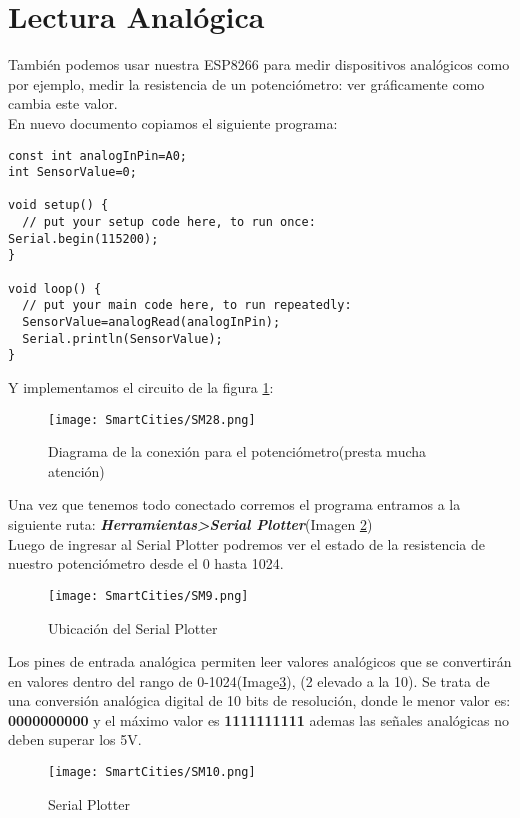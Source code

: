 \documentclass[
	12pt, %
	fleqn, %
	a4paper, %
	oneside, %
]{LegrandOrangeBook}
\begin{document}
\section{Lectura Analógica}
También podemos usar nuestra ESP8266 para medir dispositivos analógicos como por ejemplo, medir la resistencia de un potenciómetro:  ver gráficamente como cambia este valor.\\
En nuevo documento copiamos el siguiente programa:
\begin{lstlisting}[language=Arduino,caption={Medir la resistencia de un potenciómetro}]
const int analogInPin=A0;
int SensorValue=0;

void setup() {
  // put your setup code here, to run once:
Serial.begin(115200);
}

void loop() {
  // put your main code here, to run repeatedly:
  SensorValue=analogRead(analogInPin);
  Serial.println(SensorValue);
}
\end{lstlisting}
Y implementamos el circuito de la figura \ref{fig:readanalog potenciometer}:
\begin{figure}[H]
\centering\texttt{[image: SmartCities/SM28.png]}
\caption{Diagrama de la conexión para el potenciómetro(presta mucha atención)}
\label{fig:readanalog potenciometer}
\end{figure}
Una vez que tenemos todo conectado corremos el programa entramos a la siguiente ruta: \textbf{\textit{Herramientas>Serial Plotter}}(Imagen \ref{fig:UbiSerialPlotter})\\
Luego de ingresar al Serial Plotter podremos ver el estado de la resistencia de nuestro potenciómetro desde el 0 hasta 1024.\\
\begin{figure}[h]
\centering\texttt{[image: SmartCities/SM9.png]}
\caption{Ubicación del Serial Plotter}
\label{fig:UbiSerialPlotter}
\end{figure}
Los pines de entrada analógica permiten leer valores analógicos que se convertirán en valores dentro del rango de 0-1024(Image\ref{fig:SerialPlotter}), (2 elevado a la 10). Se trata de una conversión analógica digital de 10 bits de resolución, donde le menor valor es: \textbf{0000000000} y el máximo valor es \textbf{1111111111} ademas las señales analógicas no deben superar los 5V.
\begin{figure}[H]
\centering\texttt{[image: SmartCities/SM10.png]}
\caption{Serial Plotter}
\label{fig:SerialPlotter}
\end{figure}
\newpage
\end{document}
